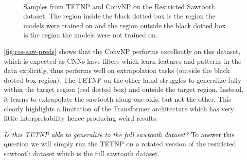 \documentclass[../../main.tex]{subfiles}
\begin{document}
\begin{figure}[H]
    \centering
    \\
    \caption{Samples from TETNP and ConvNP on the Restricted Sawtooth dataset. The region inside the black dotted box is the region the models were trained on and the region outside the black dotted box is the region the models were not trained on.}
    \label{fig:res-saw-preds}
\end{figure}

\autoref{fig:res-saw-preds} shows that the ConvNP performs excellently on this dataset, which is expected as CNNs have filters which learn features and patterns in the data explicitly, thus performs well on extrapolation tasks (outside the black dotted box region). The TETNP on the other hand struggles to generalize fully within the target region (red dotted box) and outside the target region. Instead, it learns to extrapolate the sawtooth along one axis, but not the other. This clearly highlights a limitation of the Transformer architecture which has very little interpretability hence producing weird results.

\emph{Is this TETNP able to generalize to the full sawtooth dataset?} To answer this question we will simply run the TETNP on a rotated version of the restricted sawtooth dataset which is the full sawtooth dataset.



\end{document}
